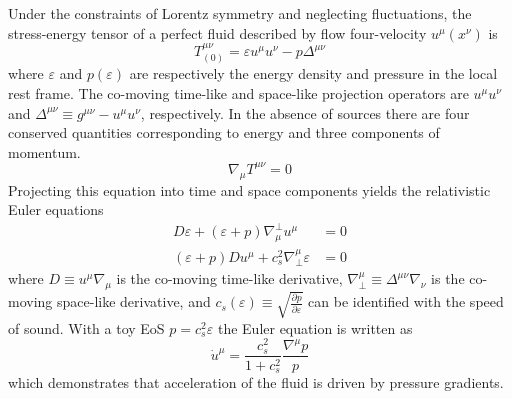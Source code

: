 Under the constraints of Lorentz symmetry and neglecting fluctuations, the stress-energy tensor of a perfect fluid described by flow four-velocity $u^\mu(x^\nu)$ is
\begin{equation}
T^{\mu\nu}_{(0)} = \varepsilon u^\mu u^\nu - p \Delta^{\mu\nu}
\end{equation}
where $\varepsilon$ and $p(\varepsilon)$ are respectively the energy density and pressure in the local rest frame.
The co-moving time-like and space-like projection operators are $u^\mu u^\nu$ and \( \Delta^{\mu\nu} \equiv g^{\mu\nu} - u^\mu u^\nu \), respectively.
In the absence of sources there are four conserved quantities corresponding to energy and three components of momentum.
\begin{equation}
  \label{eq:em_cons}
  \nabla_\mu T^{\mu\nu} = 0
\end{equation}
Projecting this equation into time and space components yields the relativistic Euler equations
\begin{align}
  D\varepsilon + \left(\varepsilon + p\right)\nabla^\perp_\mu u^\mu &= 0 \\
  \left(\varepsilon + p\right)Du^\mu + c_s^2 \nabla_\perp^\mu \varepsilon &= 0 
\end{align}
where \(D \equiv u^\mu \nabla_\mu\) is the co-moving time-like derivative, \( \nabla_\perp^\mu \equiv \Delta^{\mu\nu} \nabla_\nu \) is the co-moving space-like derivative, and \(c_s(\varepsilon) \equiv \sqrt{\frac{\partial p}{\partial \varepsilon}} \) can be identified with the speed of sound.
With a toy \ac{EoS} $p = c_s^2 \varepsilon$ the Euler equation is written as %
\begin{equation}
\dot{u}^\mu = \frac{c_s^2}{1+c_s^2} \frac{\nabla^\mu p}{p}
\end{equation}
which demonstrates that acceleration of the fluid is driven by pressure gradients.

